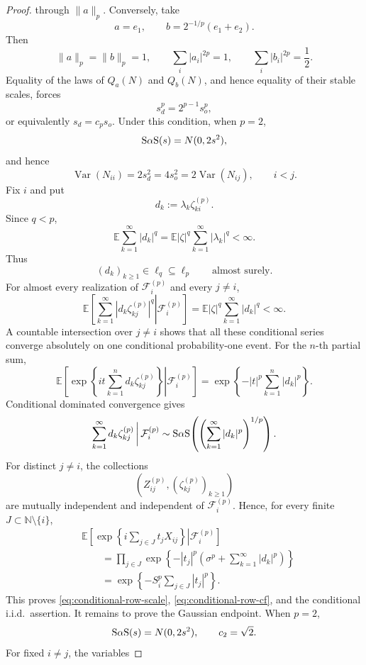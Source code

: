 \begin{proof}
through \(\|a\|_p\).
Conversely, take
\[
a=e_1,
\qquad
b=2^{-1/p}(e_1+e_2).
\]
Then
\[
\|a\|_p=\|b\|_p=1,
\qquad
\sum_i|a_i|^{2p}=1,
\qquad
\sum_i|b_i|^{2p}=\frac12.
\]
Equality of the laws of \(Q_a(N)\) and \(Q_b(N)\), and hence equality
of their stable scales, forces
\[
s_d^p=2^{p-1}s_o^p,
\]
or equivalently \(s_d=c_ps_o\). Under this condition, when \(p=2\),
\[
\mathrm{S}\alpha\mathrm{S}(s)=N(0,2s^2),
\]
and hence
\[
\operatorname{Var}(N_{ii})
=
2s_d^2
=
4s_o^2
=
2\operatorname{Var}(N_{ij}),
\qquad i<j.
\]
Fix \(i\) and put
\[
d_k:=\lambda_k\zeta^{(p)}_{ki}.
\]
Since \(q<p\),
\[
\mathbb E\sum_{k=1}^{\infty}|d_k|^q
=
\mathbb E|\zeta|^q
\sum_{k=1}^{\infty}|\lambda_k|^q
<\infty.
\]
Thus
\[
(d_k)_{k\geq1}\in\ell_q\subseteq\ell_p
\qquad\text{almost surely}.
\]
For almost every realization of \(\mathcal F_i^{(p)}\) and every
\(j\neq i\),
\[
\mathbb E\!\left[
 \left.
 \sum_{k=1}^{\infty}
 |d_k\zeta^{(p)}_{kj}|^q
 \right|
 \mathcal F_i^{(p)}
\right]
=
\mathbb E|\zeta|^q
\sum_{k=1}^{\infty}|d_k|^q
<\infty.
\]
A countable intersection over \(j\neq i\) shows that all these
conditional series converge absolutely on one conditional
probability-one event.
For the \(n\)-th partial sum,
\[
\mathbb E\!\left[
 \left.
 \exp\left\{
  it\sum_{k=1}^{n}d_k\zeta^{(p)}_{kj}
 \right\}
 \right|
 \mathcal F_i^{(p)}
\right]
=
\exp\left\{
 -|t|^p\sum_{k=1}^{n}|d_k|^p
\right\}.
\]
Conditional dominated convergence gives
\[
\sum_{k=1}^{\infty}d_k\zeta^{(p)}_{kj}
\,\bigg|\,
\mathcal F_i^{(p)}
\sim
\mathrm{S}\alpha\mathrm{S}\!\left(
 \left(\sum_{k=1}^{\infty}|d_k|^p\right)^{1/p}
\right).
\]
For distinct \(j\neq i\), the collections
\[
\left(
 Z^{(p)}_{ij},
 (\zeta^{(p)}_{kj})_{k\geq1}
\right)
\]
are mutually independent and independent of
\(\mathcal F_i^{(p)}\). Hence, for every finite
\(J\subset\mathbb N\setminus\{i\}\),
\begin{align*}
&\mathbb E\!\left[
 \left.
 \exp\left\{i\sum_{j\in J}t_jX_{ij}\right\}
 \right|
 \mathcal F_i^{(p)}
\right]                                                     \\
&\qquad=
\prod_{j\in J}
\exp\left\{
 -|t_j|^p
 \left(
  \sigma^p+\sum_{k=1}^{\infty}|d_k|^p
 \right)
\right\}                                                     \\
&\qquad=
\exp\left\{
 -S_i^p\sum_{j\in J}|t_j|^p
\right\}.
\end{align*}
This proves \eqref{eq:conditional-row-scale},
\eqref{eq:conditional-row-cf}, and the conditional i.i.d.\ assertion.
It remains to prove the Gaussian endpoint. When \(p=2\),
\[
\mathrm{S}\alpha\mathrm{S}(s)=N(0,2s^2),
\qquad
c_2=\sqrt2.
\]
For fixed \(i\neq j\), the variables

\end{proof}
